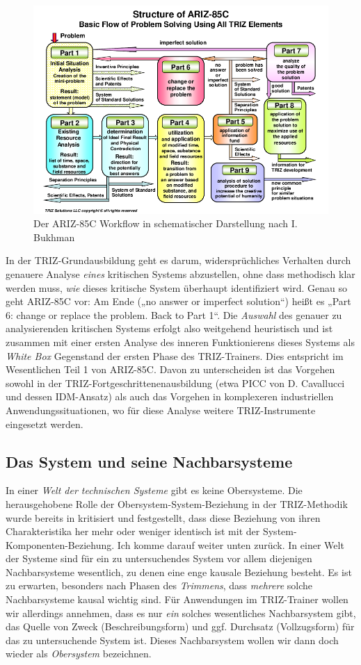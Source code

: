 \documentclass[11pt,a4paper]{article}
\begin{document}
\begin{figure}
  \includegraphics[width=.9\textwidth]{ARIZ-Workflow.png}
  \caption{Der ARIZ-85C Workflow in schematischer Darstellung nach I. Bukhman}
\end{figure}

In der TRIZ-Grundausbildung geht es darum, widersprüchliches Verhalten durch
genauere Analyse \emph{eines} kritischen Systems abzustellen, ohne dass
methodisch klar werden muss, \emph{wie} dieses kritische System überhaupt
identifiziert wird.  Genau so geht ARIZ-85C vor: Am Ende („no answer or
imperfect solution“) heißt es „Part 6: change or replace the problem. Back to
Part 1“. Die \emph{Auswahl} des genauer zu analysierenden kritischen Systems
erfolgt also weitgehend heuristisch und ist zusammen mit einer ersten Analyse
des inneren Funktionierens dieses Systems als \emph{White Box} Gegenstand der
ersten Phase des TRIZ-Trainers.  Dies entspricht im Wesentlichen Teil 1 von
ARIZ-85C.  Davon zu unterscheiden ist das Vorgehen sowohl in der
TRIZ-Fortgeschrittenenausbildung (etwa PICC \cite{Cavallucci} von
D. Cavallucci und dessen IDM-Ansatz) als auch das Vorgehen in komplexeren
industriellen Anwendungssituationen, wo für diese Analyse weitere
TRIZ-Instrumente eingesetzt werden.

\subsection*{Das System und seine Nachbarsysteme}

In einer \emph{Welt der technischen Systeme} gibt es keine Obersysteme. Die
herausgehobene Rolle der Obersystem-System-Beziehung in der TRIZ-Methodik
wurde bereits in \cite[S. 16]{Graebe2020} kritisiert und festgestellt, dass
diese Beziehung von ihren Charakteristika her mehr oder weniger identisch ist
mit der System-Komponenten-Beziehung. Ich komme darauf weiter unten zurück.
In einer Welt der Systeme sind für ein zu untersuchendes System vor allem
diejenigen Nachbarsysteme wesentlich, zu denen eine enge kausale Beziehung
besteht.  Es ist zu erwarten, besonders nach Phasen des \emph{Trimmens}, dass
\emph{mehrere} solche Nachbarsysteme kausal wichtig sind.  Für Anwendungen im
TRIZ-Trainer wollen wir allerdings annehmen, dass es nur \emph{ein} solches
wesentliches Nachbarsystem gibt, das Quelle von Zweck (Beschreibungsform) und
ggf. Durchsatz (Vollzugsform) für das zu untersuchende System ist. Dieses
Nachbarsystem wollen wir dann doch wieder als \emph{Obersystem} bezeichnen.
\end{document}
